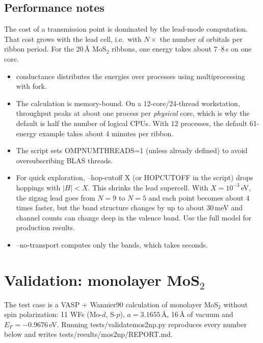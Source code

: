 \documentclass[11pt,a4paper]{article}
\newcommand{\code}[1]{{\ttfamily\def\_{\textunderscore\allowbreak}\def\slash{/\allowbreak}#1}}
\begin{document}
\subsection{Performance notes}
The cost of a transmission point is dominated by the lead-mode computation. That cost
grows with the lead cell, i.e.\ with $N\times$ the number of orbitals per ribbon period.
For the 20\,\AA{} MoS$_2$ ribbons, one energy takes about 7--8\,s on one core.
\begin{itemize}[nosep]
  \item \code{conductance} distributes the energies over processes using
        \code{multiprocessing} with \code{fork}.
  \item The calculation is memory-bound. On a 12-core/24-thread workstation, throughput
        peaks at about one process per \emph{physical} core, which is why the default is
        half the number of logical CPUs. With 12 processes, the default 61-energy example
        takes about 4 minutes per ribbon.
  \item The script sets \code{OMP\_NUM\_THREADS=1} (unless already defined) to avoid
        oversubscribing BLAS threads.
  \item For quick exploration, \code{--hop-cutoff X} (or \code{HOP\_CUTOFF} in the
        script) drops hoppings with $|H|<X$. This shrinks the lead supercell. With
        $X=10^{-3}$\,eV, the zigzag lead goes from $N=9$ to $N=5$ and each point becomes
        about 4 times faster, but the band structure changes by up to about 30\,meV and
        channel counts can change deep in the valence band. Use the full model for
        production results.
  \item \code{--no-transport} computes only the bands, which takes seconds.
\end{itemize}

\section{Validation: monolayer MoS$_2$}\label{sec:validation}

The test case is a VASP + Wannier90 calculation of monolayer MoS$_2$ without spin
polarization: 11 WFs (Mo-$d$, S-$p$), $a=3.1655$\,\AA, 16\,\AA{} of vacuum and
$E_F=-0.9676$\,eV. Running \code{tests/validate\_mos2\_np.py} reproduces every number below
and writes \code{tests/results/mos2\_np/REPORT.md}.
\end{document}
